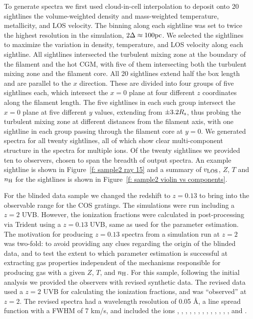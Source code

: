 \documentclass[fleqn,usenatbib]{mnras}
\begin{document}
To generate spectra we first used cloud-in-cell interpolation to deposit onto 20 sightlines the volume-weighted density and mass-weighted temperature, metallicity, and LOS velocity.
The binning along each sightline was set to twice the highest resolution in the simulation, $2\Delta \approx 100{\rm pc}$.
We selected the sightlines to maximize the variation in density, temperature, and LOS velocity along each sightline.
All sightlines intersected the turbulent mixing zone at the boundary of the filament and the hot CGM, with five of them intersecting both the turbulent mixing zone and the filament core.
All 20 sightlines extend half the box length and are parallel to the $x$ direction.
These are divided into four groups of five sightlines each, which intersect the $x=0$ plane at four different $z$ coordinates along the filament length.
The five sightlines in each such group intersect the $x=0$ plane at five different $y$ values, extending from $\pm 3.2R_{\rm s}$, thus probing the turbulent mixing zone at different distances from the filament axis, with one sightline in each group passing through the filament core at $y=0$.
We generated spectra for all twenty sightlines, all of which show clear multi-component structure in the spectra for multiple ions.
Of the twenty sightlines we provided ten to observers, chosen to span the breadth of output spectra.
An example sightline is shown in Figure~\ref{f: sample2 ray 15} and a summary of $v_{\rm LOS}$, $Z$, $T$ and $n_{\rm H}$ for the sightlines is shown in Figure~\ref{f: sample2 violin vs components}.

For the blinded data sample we changed the redshift to $z=0.13$ to bring  into the observable range for the COS gratings.
The simulations were run including a $z=2$ UVB.
However, the ionization fractions were calculated in post-processing via Trident using a $z=0.13$ \cite{haardt2012RADIATIVE} UVB, same as used for the parameter estimation.
The motivation for producing $z=0.13$ spectra from a simulation run at $z=2$ was two-fold:
to avoid providing any clues regarding the origin of the blinded data,
and to test the extent to which parameter estimation is successful at extracting gas properties independent of the mechanisms responsible for producing gas with a given $Z$, $T$, and $n_{\rm H}$.
For this sample, following the initial analysis we provided the observers with revised synthetic data.
The revised data used a $z=2$ UVB for calculating the ionization fractions, and was ``observed'' at $z=2$.
The revised spectra had a wavelength resolution of 0.05 \AA,
a line spread function with a FWHM of 7 km/s,
and included the ions , , , , , , , , , , , , , and .
\end{document}
